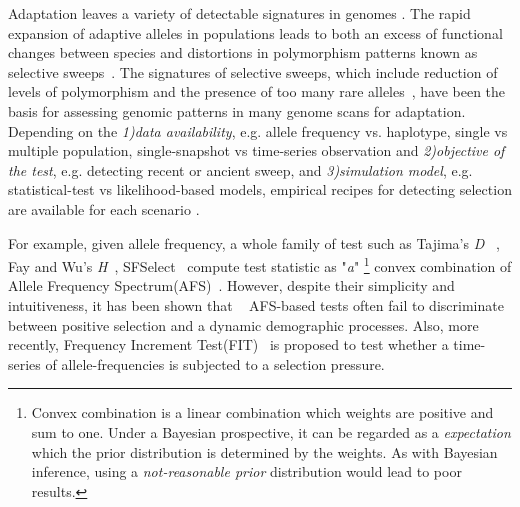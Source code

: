 \documentclass[11pt]{article}
\begin{document}
Adaptation leaves a variety of detectable signatures in
genomes \cite{nielsen2005genomic,akey2009constructing,
kreitman2000methods,messer2013population,sabeti2006positive}.
The rapid expansion of adaptive alleles in populations leads to both an excess
of functional changes between species and distortions in polymorphism patterns
known as selective sweeps~\cite{nielsen2005genomic}. The signatures of
selective sweeps, which include reduction of levels of polymorphism and the
presence of too many rare alleles~\cite{nielsen2005genomic,
przeworski2002signature}, have been the basis for assessing genomic
patterns in many genome scans for adaptation. Depending on the
\emph{1)data availability}, e.g. allele frequency vs. haplotype, single vs 
multiple  population, single-snapshot vs time-series observation and 
\emph{2)objective of the test}, e.g. detecting recent or ancient
sweep, and \emph{3)simulation model}, e.g. statistical-test vs likelihood-based 
models, empirical recipes for detecting selection are available for each
scenario \cite{sabeti2006positive}.

For example, given allele frequency, a whole family of test such as 
Tajima's \emph{D} ~\cite{tajima1989statistical}, 
Fay and Wu's \emph{H}~\cite{fay2000hitchhiking}, 
SFSelect~\cite{ronen2013learning} compute test statistic as "\emph{a}"
\footnote{Convex combination is a linear combination which weights are positive
	 and sum to one. Under a Bayesian prospective, it can be regarded as a
	  \emph{expectation} which the prior distribution is determined by the
	   weights. As with Bayesian inference, using a \emph{not-reasonable prior}
	    distribution would lead to poor results.} 
	convex 
combination of Allele Frequency Spectrum(AFS)~\cite{achaz2009frequency}. 
However, despite their simplicity and intuitiveness, it has been shown that
 ~\cite{ptak2002evidence, ramos2002statistical} AFS-based tests often fail 
 to discriminate between positive selection and a dynamic
demographic processes. Also, more recently, Frequency Increment
 Test(FIT)~\cite{feder2014Identifying} is  proposed to test whether a
  time-series of allele-frequencies is subjected to a selection pressure.
\end{document}
